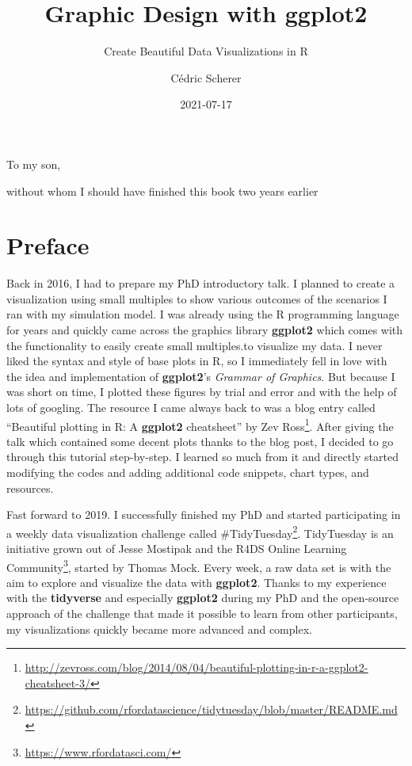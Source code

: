 \documentclass[
]{krantz}
\title{Graphic Design with ggplot2}
\subtitle{Create Beautiful Data Visualizations in R}
\author{Cédric Scherer}
\date{2021-07-17}
\renewcommand{\href}[2]{#2\footnote{\url{#1}}}
\begin{document}
\maketitle


\thispagestyle{empty}

\begin{center}
To my son,

without whom I should have finished this book two years earlier
\end{center}

\setlength{\abovedisplayskip}{-5pt}
\setlength{\abovedisplayshortskip}{-5pt}

{
\hypersetup{linkcolor=}
\setcounter{tocdepth}{2}
\tableofcontents
}
\listoftables
\listoffigures
\hypertarget{preface}{%
\chapter*{Preface}\label{preface}}


Back in 2016, I had to prepare my PhD introductory talk. I planned to create a visualization using small multiples to show various outcomes of the scenarios I ran with my simulation model. I was already using the R programming language for years and quickly came across the graphics library \textbf{ggplot2} which comes with the functionality to easily create small multiples.to visualize my data. I never liked the syntax and style of base plots in R, so I immediately fell in love with the idea and implementation of \textbf{ggplot2}'s \emph{Grammar of Graphics}. But because I was short on time, I plotted these figures by trial and error and with the help of lots of googling. The resource I came always back to was a blog entry called \href{http://zevross.com/blog/2014/08/04/beautiful-plotting-in-r-a-ggplot2-cheatsheet-3/}{``Beautiful plotting in R: A \textbf{ggplot2} cheatsheet'' by Zev Ross}. After giving the talk which contained some decent plots thanks to the blog post, I decided to go through this tutorial step-by-step. I learned so much from it and directly started modifying the codes and adding additional code snippets, chart types, and resources.

Fast forward to 2019. I successfully finished my PhD and started participating in a weekly data visualization challenge called \href{https://github.com/rfordatascience/tidytuesday/blob/master/README.md}{\#TidyTuesday}. TidyTuesday is an initiative grown out of Jesse Mostipak and the \href{https://www.rfordatasci.com/}{R4DS Online Learning Community}, started by Thomas Mock. Every week, a raw data set is with the aim to explore and visualize the data with \textbf{ggplot2}. Thanks to my experience with the \textbf{tidyverse} and especially \textbf{ggplot2} during my PhD and the open-source approach of the challenge that made it possible to learn from other participants, my visualizations quickly became more advanced and complex.
\end{document}
